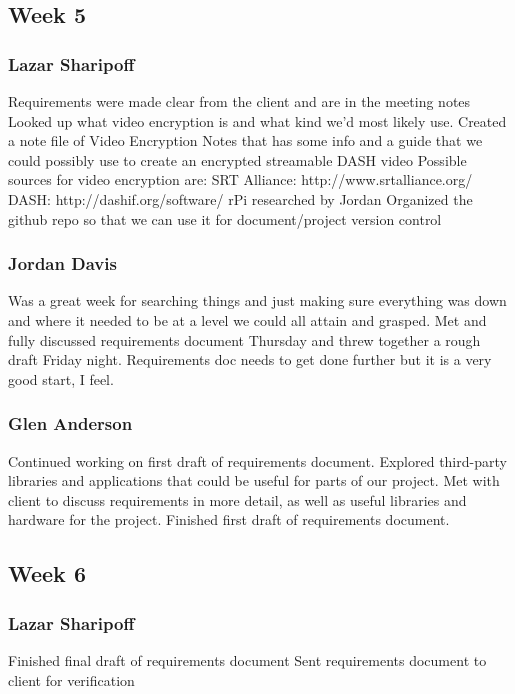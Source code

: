 \documentclass[onecolumn, draftclsnofoot,10pt, compsoc]{IEEEtran}
\newcommand\tab[1][1cm]{\hspace*{#1}}
\begin{document}
\subsection{Week 5}
\subsubsection{Lazar Sharipoff}
Requirements were made clear from the client and are in the meeting notes
\newline Looked up what video encryption is and what kind we'd most likely use.
\newline Created a note file of Video Encryption Notes that has some info and a guide that we could possibly use to create an encrypted streamable DASH video
\newline Possible sources for video encryption are:
\newline \tab SRT Alliance: http://www.srtalliance.org/
\newline \tab DASH: http://dashif.org/software/
\newline rPi researched by Jordan
\newline Organized the github repo so that we can use it for document/project version control


\subsubsection{Jordan Davis}
Was a great week for searching things and just making sure everything was down and where it needed to be at a level we could all attain and grasped. Met and fully discussed requirements document Thursday and threw together a rough draft Friday night. Requirements doc needs to get done further but it is a very good start, I feel.


\subsubsection{Glen Anderson}
Continued working on first draft of requirements document. Explored third-party libraries and applications that could be useful for parts of our project. Met with client to discuss requirements in more detail, as well as useful libraries and hardware for the project. Finished first draft of requirements document.


\subsection{Week 6}
\subsubsection{Lazar Sharipoff}
Finished final draft of requirements document
\newline Sent requirements document to client for verification
\end{document}
